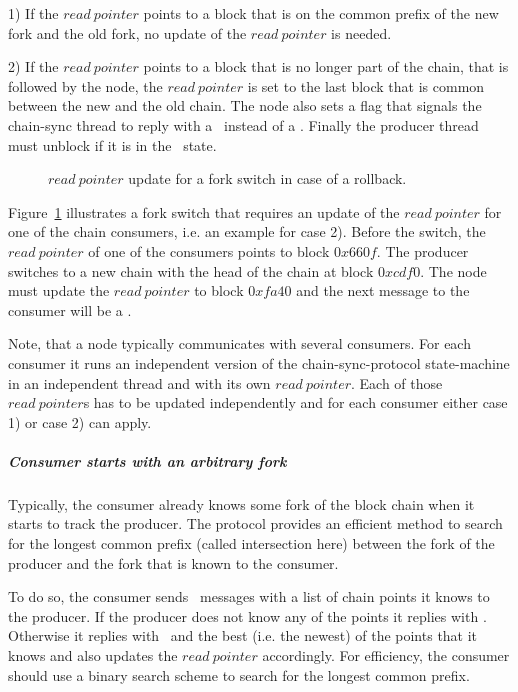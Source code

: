 \documentclass{report}
\theoremstyle{definition}{
  \newtheorem{lemma}{Lemma}[section] %
  \newtheorem{definition}[lemma]{Definition}
}
\theoremstyle{theorem}{
  \newtheorem{invariant}[lemma]{Invariant}
  \newtheorem{proofobligation}[lemma]{Proof Obligation}
}
\numberwithin{equation}{lemma}
\begin{document}
1) If the $read~pointer$ points to a block that is on the common prefix of the new
fork and the old fork, no update of the $read~pointer$ is needed.

2) If the $read~pointer$ points to a block that is no longer part of the chain,
that is followed by the node,
the $read~pointer$ is set to the last block that is common between the new and the old chain.
The node also sets a flag that signals the chain-sync thread to reply with a \RollBackward~instead
of a \RollForward.
Finally the producer thread must unblock if it is in the \MustReply~state.

\begin{figure}[h]
\begin{center}
\end{center}
\caption{$read~pointer$ update for a fork switch in case of a rollback.}
\label{read-pointer-rollback}
\end{figure}

Figure~\ref{read-pointer-rollback} illustrates a fork switch that requires an update of the $read~pointer$
for one of the chain consumers, i.e. an example for case 2).
Before the switch, the $read~pointer$ of one of the consumers points to block $0x660f$.
The producer switches to a new chain with the head of the chain at block $0xcdf0$.
The node must update the $read~pointer$ to block $0xfa40$ and the next message to the consumer will be a \RollBackward.

Note, that a node typically communicates with several consumers. For each consumer it runs an independent
version of the chain-sync-protocol state-machine in an independent thread and with its own $read~pointer$.
Each of those $read~pointer$s has to be updated independently and for each consumer
either case 1) or case 2) can apply.

\subparagraph{Consumer starts with an arbitrary fork}
Typically, the consumer already knows some fork of the block chain when it
starts to track the producer.
The protocol provides an efficient method to search for the longest common prefix (called intersection here)
between the fork of the producer and the fork that is known to the consumer.

To do so, the consumer sends \FindIntersect~messages with a list of chain points it knows to the producer.
If the producer does not know any of the points it replies with \IntersectUnchanged.
Otherwise it replies with \IntersectImproved~and the best (i.e. the newest) of the points that it knows
and also updates the $read~pointer$ accordingly.
For efficiency, the consumer should use a binary search scheme to search for the longest common
prefix.
\end{document}
